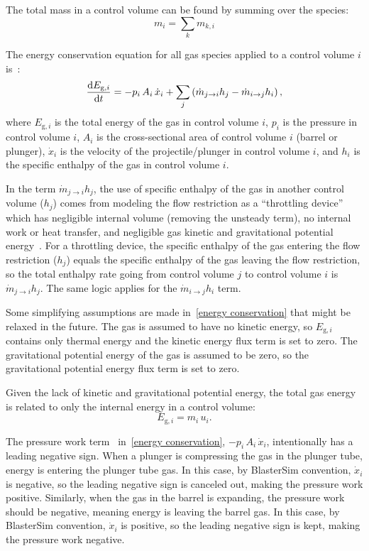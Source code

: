 The total mass in a control volume can be found by summing over the species:
\begin{equation}
    m_i = \sum_k m_{k,i}
\end{equation}

The energy conservation equation for all gas species applied to a control volume $i$ is~\citep[eq.~4.15, p.~157]{moran_fundamentals_2008}:
\begin{equation}
    \dv{E_{\text{g},i}}{t} = -p_i \, A_i \, \dot{x}_i + \sum_j \left(\dot{m}_{j \rightarrow i} h_j - \dot{m}_{i \rightarrow j} h_i\right),\label{eq:energy conservation}
\end{equation}
where
$E_{\text{g},i}$ is the total energy of the gas in control volume $i$,
$p_i$ is the pressure in control volume $i$,
$A_i$ is the cross-sectional area of control volume $i$ (barrel or plunger),
$\dot{x}_i$ is the velocity of the projectile/plunger in control volume $i$, and
$h_i$ is the specific enthalpy of the gas in control volume $i$.

In the term $\dot{m}_{j \rightarrow i} h_j$, the use of specific enthalpy of the gas in another control volume ($h_j$) comes from modeling the flow restriction as a ``throttling device'' which has negligible internal volume (removing the unsteady term), no internal work or heat transfer, and negligible gas kinetic and gravitational potential energy~\citep[p.~177]{moran_fundamentals_2008}.
For a throttling device, the specific enthalpy of the gas entering the flow restriction ($h_j$) equals the specific enthalpy of the gas leaving the flow restriction, so the total enthalpy rate going from control volume $j$ to control volume $i$ is $\dot{m}_{j \rightarrow i} h_j$.
The same logic applies for the $\dot{m}_{i \rightarrow j} h_i$ term.

Some simplifying assumptions are made in~\eqref{energy conservation} that might be relaxed in the future.
The gas is assumed to have no kinetic energy, so $E_{\text{g},i}$ contains only thermal energy and the kinetic energy flux term is set to zero.
The gravitational potential energy of the gas is assumed to be zero, so the gravitational potential energy flux term is set to zero.

Given the lack of kinetic and gravitational potential energy, the total gas energy is related to only the internal energy in a control volume:
\begin{equation}
    E_{\text{g},i} = m_i \, u_i.
\end{equation}

The pressure work term~\citep[p.~39]{moran_fundamentals_2008} in~\eqref{energy conservation}, $-p_i \, A_i \, \dot{x}_i$, intentionally has a leading negative sign.
When a plunger is compressing the gas in the plunger tube, energy is entering the plunger tube gas.
In this case, by BlasterSim convention, $\dot{x}_i$ is negative, so the leading negative sign is canceled out, making the pressure work positive.
Similarly, when the gas in the barrel is expanding, the pressure work should be negative, meaning energy is leaving the barrel gas.
In this case, by BlasterSim convention, $\dot{x}_i$ is positive, so the leading negative sign is kept, making the pressure work negative.


